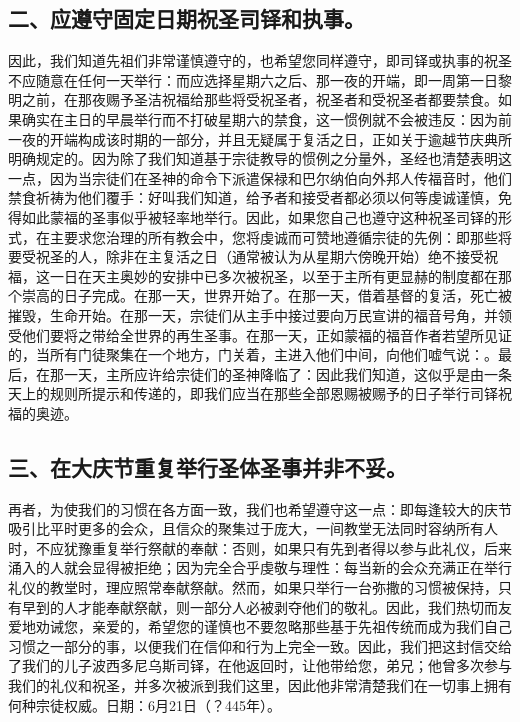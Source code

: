 
\subsection{二、应遵守固定日期祝圣司铎和执事。}

因此，我们知道先祖们非常谨慎遵守的，也希望您同样遵守，即司铎或执事的祝圣不应随意在任何一天举行：而应选择星期六之后、那一夜的开端，即一周第一日黎明之前，在那夜赐予圣洁祝福给那些将受祝圣者，祝圣者和受祝圣者都要禁食。如果确实在主日的早晨举行而不打破星期六的禁食，这一惯例就不会被违反：因为前一夜的开端构成该时期的一部分，并且无疑属于复活之日，正如关于逾越节庆典所明确规定的。因为除了我们知道基于宗徒教导的惯例之分量外，圣经也清楚表明这一点，因为当宗徒们在圣神的命令下派遣保禄和巴尔纳伯向外邦人传福音时，他们禁食祈祷为他们覆手：好叫我们知道，给予者和接受者都必须以何等虔诚谨慎，免得如此蒙福的圣事似乎被轻率地举行。因此，如果您自己也遵守这种祝圣司铎的形式，在主要求您治理的所有教会中，您将虔诚而可赞地遵循宗徒的先例：即那些将要受祝圣的人，除非在主复活之日（通常被认为从星期六傍晚开始）绝不接受祝福，这一日在天主奥妙的安排中已多次被祝圣，以至于主所有更显赫的制度都在那个崇高的日子完成。在那一天，世界开始了。在那一天，借着基督的复活，死亡被摧毁，生命开始。在那一天，宗徒们从主手中接过要向万民宣讲的福音号角，并领受他们要将之带给全世界的再生圣事。在那一天，正如蒙福的福音作者若望所见证的，当所有门徒聚集在一个地方，门关着，主进入他们中间，向他们嘘气说：。最后，在那一天，主所应许给宗徒们的圣神降临了：因此我们知道，这似乎是由一条天上的规则所提示和传递的，即我们应当在那些全部恩赐被赐予的日子举行司铎祝福的奥迹。\par


\subsection{三、在大庆节重复举行圣体圣事并非不妥。}

再者，为使我们的习惯在各方面一致，我们也希望遵守这一点：即每逢较大的庆节吸引比平时更多的会众，且信众的聚集过于庞大，一间教堂无法同时容纳所有人时，不应犹豫重复举行祭献的奉献：否则，如果只有先到者得以参与此礼仪，后来涌入的人就会显得被拒绝；因为完全合乎虔敬与理性：每当新的会众充满正在举行礼仪的教堂时，理应照常奉献祭献。然而，如果只举行一台弥撒的习惯被保持，只有早到的人才能奉献祭献，则一部分人必被剥夺他们的敬礼。因此，我们热切而友爱地劝诫您，亲爱的，希望您的谨慎也不要忽略那些基于先祖传统而成为我们自己习惯之一部分的事，以便我们在信仰和行为上完全一致。因此，我们把这封信交给了我们的儿子波西多尼乌斯司铎，在他返回时，让他带给您，弟兄；他曾多次参与我们的礼仪和祝圣，并多次被派到我们这里，因此他非常清楚我们在一切事上拥有何种宗徒权威。日期：6月21日（？445年）。\par

